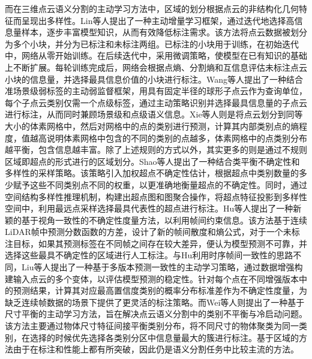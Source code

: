 而在三维点云语义分割的主动学习方法中，区域的划分根据点云的非结构化几何特征而呈现出多样性。Lin等人提出了一种主动增量学习框架，通过迭代地选择高信息量样本，逐步丰富模型知识，从而有效降低标注需求。该方法将点云数据被划分为多个小块，并分为已标注和未标注两组。已标注的小块用于训练，在初始迭代中，网络从零开始训练。在后续迭代中，采用微调策略，使模型在已有知识的基础上不断扩展。每轮训练完成后，网络会根据点熵、分割熵和互信息评估未标注点云小块的信息量，并选择最具信息价值的小块进行标注。Wang等人提出了一种结合准场景级弱标签的主动弱监督框架，用具有固定半径的球形子点云作为查询单位，每个子点云类别仅需一个点级标签，通过主动策略识别并选择最具信息量的子点云进行标注，从而同时兼顾场景级和点级语义信息。Xie等人则是将点云划分到同等大小的体素网格中，然后对网格中的点的类别进行预测，计算其内部类别点的熵程度，值越高说明体素网格中包含的不同的类别的点越多，体素网格中的点类别分布越平衡，包含信息越丰富。除了上述规则的方式以外，其实更多的则是通过不规则区域即超点的形式进行的区域划分。Shao等人提出了一种结合类平衡不确定性和多样性的采样策略。该策略引入加权超点不确定性估计，根据超点中类别数量的多少赋予这些不同类别点不同的权重，以更准确地衡量超点的不确定性。同时，通过空间结构多样性推理机制，构建出超点图和图聚合操作，将超点特征投影到多样性空间中，利用最远点采样选择最具代表性的超点进行标注。Hu等人提出了一种新颖的基于视角一致性的不确定性度量方法，以利用帧间约束信息。该方法基于连续 LiDAR帧中预测分数函数的方差，设计了新的帧间散度和熵公式，对于一个未标注目标，如果其预测标签在不同帧之间存在较大差异，便认为模型预测不可靠，并选择这些最具不确定性的区域进行人工标注。与Hu利用时序帧间一致性的思路不同，Liu等人提出了一种基于多版本预测一致性的主动学习策略，通过数据增强构建输入点云的多个变体，以评估模型预测的稳定性。针对每个点在不同增强版本中的预测结果，计算其对应最高置信度类别的概率分布标准差作为不确定性度量，为缺乏连续帧数据的场景下提供了更灵活的标注策略。而Wei等人则提出了一种基于尺寸平衡的主动学习方法，旨在解决点云语义分割中的类别不平衡与冷启动问题。该方法主要通过物体尺寸特征间接平衡类别分布，将不同尺寸的物体聚类为同一类别，在选择的时候优先选择各类别分区中信息量最大的簇进行标注。基于区域的方法由于在标注和性能上都有所突破，因此仍是语义分割任务中比较主流的方法。
